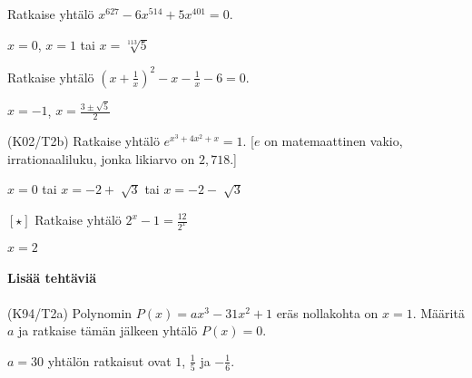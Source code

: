 \begin{tehtavasivu}
\begin{tehtava}
	Ratkaise yhtälö $x^{627} - 6x^{514} + 5x^{401} = 0$.
	\begin{vastaus}
		$x = 0$, $x = 1$ tai $x = \sqrt[113]{5}$
	\end{vastaus}
\end{tehtava}

\begin{tehtava}
	Ratkaise yhtälö $(x+\frac{1}{x})^2-x-\frac{1}{x}-6 = 0$.
	\begin{vastaus}
		$x = -1$, $x = \frac{3\pm \sqrt{5}}{2}$
	\end{vastaus}
\end{tehtava}

\begin{tehtava}
	(K02/T2b) Ratkaise yhtälö $e^{x^3+4x^2+x}=1$. [$e$ on matemaattinen vakio, irrationaaliluku, jonka likiarvo on $2,718$.]
	\begin{vastaus}
	$x=0$ tai $x=-2 + \sqrt[]{3}$ tai $x=-2 - \sqrt[]{3}$
	\end{vastaus}
\end{tehtava}

\begin{tehtava}
	$[ \star ]$ Ratkaise yhtälö $2^x-1=\frac{12}{2^x}$
	\begin{vastaus}
	$x=2$
	\end{vastaus}
\end{tehtava}

\paragraph*{Lisää tehtäviä}

\begin{tehtava} %
(K94/T2a) Polynomin $P(x)=ax^3-31x^2+1$ eräs nollakohta on $x=1$. Määritä $a$ ja ratkaise tämän jälkeen yhtälö $P(x)=0$.
\begin{vastaus}
      $a=30$ yhtälön ratkaisut ovat $1$, $\frac{1}{5}$ ja $-\frac{1}{6}$.
    \end{vastaus}
\end{tehtava}

\end{tehtavasivu}
